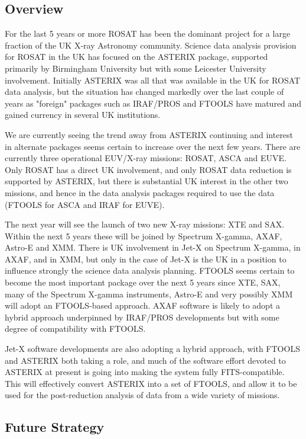 \subsection{Overview}

For the last 5 years or more ROSAT has been the dominant project for a
large fraction of the UK X-ray Astronomy community. Science data
analysis provision for ROSAT in the UK has focused on the ASTERIX
package, supported primarily by Birmingham University but with some
Leicester University involvement. Initially ASTERIX was all that was
available in the UK for ROSAT data analysis, but the situation has
changed markedly over the last couple of years as "foreign" packages
such as IRAF/PROS and FTOOLS have matured and gained currency in
several UK institutions.

We are currently seeing the trend away from ASTERIX continuing and
interest in alternate packages seems certain to increase over the next
few years. There are currently three operational EUV/X-ray missions:
ROSAT, ASCA and EUVE. Only ROSAT has a direct UK involvement, and only
ROSAT data reduction is supported by ASTERIX, but there is substantial
UK interest in the other two missions, and hence in the data analysis
packages required to use the data (FTOOLS for ASCA and IRAF for EUVE).

The next year will see the launch of two new X-ray missions: XTE and
SAX.  Within the next 5 years these will be joined by Spectrum
X-gamma, AXAF, Astro-E and XMM. There is UK involvement in Jet-X on
Spectrum X-gamma, in AXAF, and in XMM, but only in the case of Jet-X
is the UK in a position to influence strongly the science data
analysis planning. FTOOLS seems certain to become the most important
package over the next 5 years since XTE, SAX, many of the Spectrum
X-gamma instruments, Astro-E and very possibly XMM will adopt an
FTOOLS-based approach. AXAF software is likely to adopt a hybrid
approach underpinned by IRAF/PROS developments but with some degree of
compatibility with FTOOLS.

Jet-X software developments are also adopting a hybrid approach, with
FTOOLS and ASTERIX both taking a role, and much of the software effort
devoted to ASTERIX at present is going into making the system fully
FITS-compatible. This will effectively convert ASTERIX into a set of
FTOOLS, and allow it to be used for the post-reduction analysis of
data from a wide variety of missions.

\subsection{Future Strategy}

